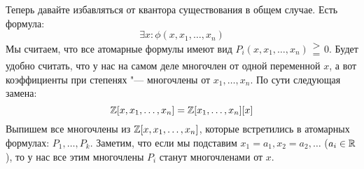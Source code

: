 	Теперь давайте избавляться от квантора существования в общем случае.
	Есть формула:
	\[ \exists x \colon \phi(x, x_1, \dots, x_n) \]
	Мы считаем, что все атомарные формулы имеют вид $P_i(x, x_1, \dots, x_n) \begin{smallmatrix}>\\=\end{smallmatrix} 0$.
	Будет удобно считать, что у нас на самом деле многочлен от одной переменной $x$,
	а вот коэффициенты при степенях "--- многочлены от $x_1, \dots, x_n$.
	По сути следующая замена:
	\[ \mathbb{Z}[x, x_1, \dots, x_n] = \mathbb{Z}[x_1, \dots, x_n][x] \]
	Выпишем все многочлены из $\mathbb{Z}[x, x_1, \dots, x_n]$, которые встретились в атомарных формулах: $P_1, \dots, P_k$.
	Заметим, что если мы подставим $x_1=a_1, x_2=a_2, \dots$ ($a_i \in \mathbb{R}$), то у нас все этим многочлены $P_i$ станут многочленами от $x$.

